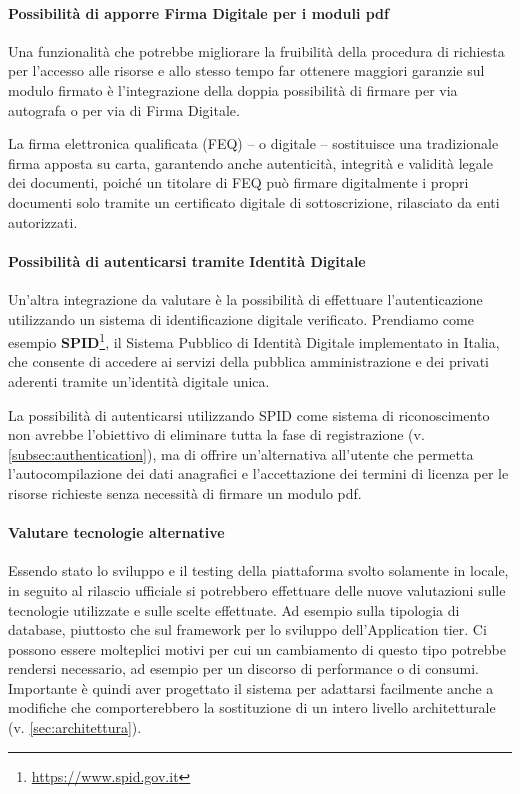 \paragraph{Possibilità di apporre Firma Digitale per i moduli pdf}
Una funzionalità che potrebbe migliorare la fruibilità della procedura di richiesta
per l'accesso alle risorse e allo stesso tempo far ottenere maggiori garanzie sul
modulo firmato è l'integrazione della doppia possibilità di firmare per via autografa
o per via di Firma Digitale.

La firma elettronica qualificata (FEQ) -- o digitale -- sostituisce una tradizionale
firma apposta su carta, garantendo anche autenticità, integrità e validità legale
dei documenti, poiché un titolare di FEQ può firmare digitalmente i propri documenti
solo tramite un certificato digitale di sottoscrizione, rilasciato da enti autorizzati.

\paragraph{Possibilità di autenticarsi tramite Identità Digitale}
Un'altra integrazione da valutare è la possibilità di effettuare l'autenticazione
utilizzando un sistema di identificazione digitale verificato.
Prendiamo come esempio \textbf{SPID}\footnote{\url{https://www.spid.gov.it}},
il Sistema Pubblico di Identità Digitale implementato in Italia, che consente di
accedere ai servizi della pubblica amministrazione e dei privati aderenti tramite
un'identità digitale unica.

La possibilità di autenticarsi utilizzando SPID come sistema di riconoscimento
non avrebbe l’obiettivo di eliminare tutta la fase di registrazione
(v. \autoref{subsec:authentication}), ma di offrire un’alternativa all’utente che
permetta l'autocompilazione dei dati anagrafici e l'accettazione dei termini di
licenza per le risorse richieste senza necessità di firmare un modulo pdf.

\paragraph{Valutare tecnologie alternative}
Essendo stato lo sviluppo e il testing della piattaforma svolto solamente in locale,
in seguito al rilascio ufficiale si potrebbero effettuare delle nuove valutazioni
sulle tecnologie utilizzate e sulle scelte effettuate. Ad esempio sulla tipologia
di database, piuttosto che sul framework per lo sviluppo dell'Application tier.
Ci possono essere molteplici motivi per cui un cambiamento di questo tipo
potrebbe rendersi necessario, ad esempio per un discorso di performance o di
consumi. Importante è quindi aver progettato il sistema per adattarsi facilmente
anche a modifiche che comporterebbero la sostituzione di un intero livello
architetturale (v. \autoref{sec:architettura}).